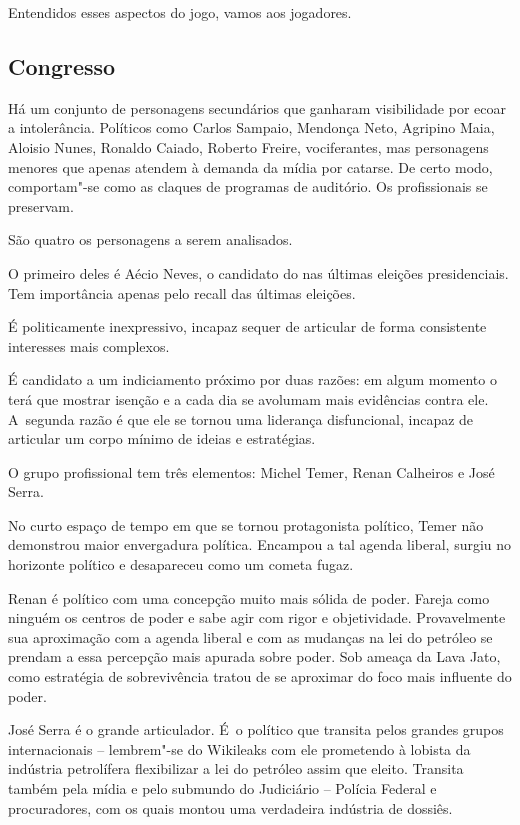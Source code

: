 Entendidos esses aspectos do jogo, vamos aos jogadores.

\subsection{Congresso}

Há um conjunto de personagens secundários que ganharam visibilidade por
ecoar a intolerância. Políticos como Carlos Sampaio, Mendonça Neto,
Agripino Maia, Aloisio Nunes, Ronaldo Caiado, Roberto Freire,
vociferantes, mas personagens menores que apenas atendem à demanda da
mídia por catarse. De certo modo, comportam"-se como as claques de
programas de auditório. Os profissionais se preservam.

São quatro os personagens a serem analisados.

O primeiro deles é Aécio Neves, o candidato do  nas últimas eleições
presidenciais. Tem importância apenas pelo recall das últimas eleições.

É politicamente inexpressivo, incapaz sequer de articular de forma
consistente interesses mais complexos.

É candidato a um indiciamento próximo por duas razões: em algum momento
o  terá que mostrar isenção e a cada dia se avolumam mais evidências
contra ele. A~segunda razão é que ele se tornou uma liderança
disfuncional, incapaz de articular um corpo mínimo de ideias e
estratégias.

O grupo profissional tem três elementos: Michel Temer, Renan Calheiros e
José Serra.

No curto espaço de tempo em que se tornou protagonista político, Temer
não demonstrou maior envergadura política. Encampou a tal agenda
liberal, surgiu no horizonte político e desapareceu como um cometa
fugaz.

Renan é político com uma concepção muito mais sólida de poder. Fareja
como ninguém os centros de poder e sabe agir com rigor e objetividade.
Provavelmente sua aproximação com a agenda liberal e com as mudanças na
lei do petróleo se prendam a essa percepção mais apurada sobre poder.
Sob ameaça da Lava Jato, como estratégia de sobrevivência tratou de se
aproximar do foco mais influente do poder.

José Serra é o grande articulador. É~o político que transita pelos
grandes grupos internacionais -- lembrem"-se do Wikileaks com ele
prometendo à lobista da indústria petrolífera flexibilizar a lei do
petróleo assim que eleito. Transita também pela mídia e pelo submundo do
Judiciário -- Polícia Federal e procuradores, com os quais montou uma
verdadeira indústria de dossiês.~

